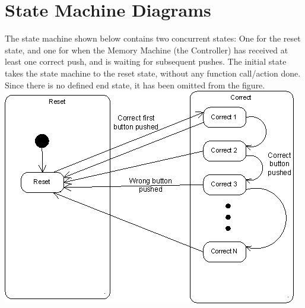 \documentclass{article}
\begin{document}
\section{State Machine Diagrams}
The state machine shown below contains two concurrent states: One for the reset
state, and one for when the Memory Machine (the Controller) has received at
least one correct push, and is waiting for subsequent pushes. The initial state
takes the state machine to the reset state, without any function call/action
done. Since there is no defined end state, it has been omitted from the figure.
  \includegraphics[width=\linewidth]{../state_hierarchical}
\end{document}
